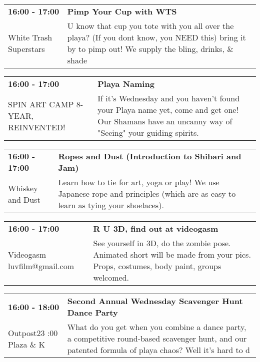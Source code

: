 \begin{tabular}{ p{1in} p{2.2in} }
    \textbf{16:00 - 17:00} & \textbf{Pimp Your Cup with WTS} \\
    White Trash Superstars \newline  & U know that cup you tote with you all over the playa? (If you dont know, you NEED this) bring it by to pimp out! We supply the bling, drinks, \& shade \\
    \hline 
\end{tabular}
    
\begin{tabular}{ p{1in} p{2.2in} }
    \textbf{16:00 - 17:00} & \textbf{Playa Naming} \\
    SPIN ART CAMP 8-YEAR, REINVENTED! \newline  & If it's Wednesday and you haven't found your Playa name yet, come and get one! Our Shamans have an uncanny way of "Seeing" your guiding spirits. \\
    \hline 
\end{tabular}
    
\begin{tabular}{ p{1in} p{2.2in} }
    \textbf{16:00 - 17:00} & \textbf{Ropes and Dust (Introduction to Shibari and Jam)} \\
    Whiskey and Dust \newline  & Learn how to tie for art, yoga or play! We use Japanese rope and principles (which are as easy to learn as tying your shoelaces). \\
    \hline 
\end{tabular}
    
\begin{tabular}{ p{1in} p{2.2in} }
    \textbf{16:00 - 17:00} & \textbf{R U 3D, find out at videogasm} \\
    Videogasm \newline luvfilm@gmail.com & See yourself in 3D, do the zombie pose. Animated short will be made from your pics. Props, costumes, body paint, groups  welcomed. \\
    \hline 
\end{tabular}
    
\begin{tabular}{ p{1in} p{2.2in} }
    \textbf{16:00 - 18:00} & \textbf{Second Annual Wednesday Scavenger Hunt Dance Party} \\
    Outpost23 \newline 6:00 Plaza \& K & What do you get when you combine a dance party, a competitive round-based scavenger hunt, and our patented formula of playa chaos? Well it's hard to d \\
    \hline 
\end{tabular}
    
